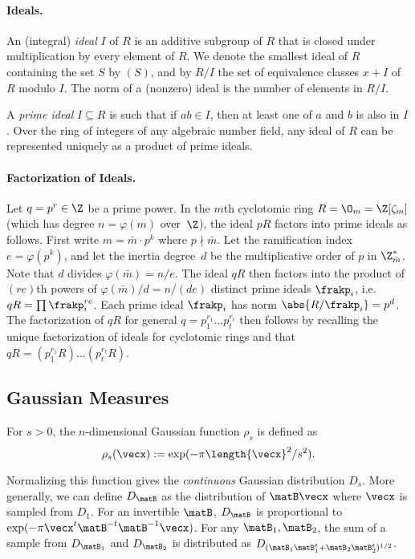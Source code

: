\paragraph{Ideals.}\label{par:ideals} An (integral) \emph{ideal} $I$ of $R$ is an
additive subgroup of $R$ that is closed under multiplication by every
element of $R$. We denote the smallest ideal of $R$ containing the set
$S$ by $(S)$, and by $R/I$ the set of equivalence classes $x+I$ of $R$
modulo $I$. The norm of a (nonzero) ideal is the number of elements in
$R/I$.

A \emph{prime ideal} $I \subseteq R$ is such that if $ab \in I$,
then at least one of $a$ and $b$ is also in $I$. Over the ring of
integers of any algebraic number field, any ideal of $R$ can be
represented uniquely as a product of prime ideals.

\paragraph{Factorization of Ideals.}\label{par:ideal-fact} Let $q=p^r \in \Z$ be a prime power.  In the $m$th cyclotomic ring
$R=\O_{m} = \Z[\zeta_{m}]$ (which has degree $n=\varphi(m)$
over~$\Z$), the ideal $pR$ factors into prime ideals as follows. First
write $m = \bar{m}\cdot p^{k}$ where $p \nmid \bar{m}$. Let the
ramification index 
$e = \varphi(p^{k})$, and let the inertia degree~$d$ be the multiplicative order of $p$
in $\Z_{\bar{m}}^{*}$. Note that $d$ divides $\varphi(\bar{m}) =
n/e$.
The ideal $qR$ then factors into the product of $(re)$th powers of
$\varphi(\bar{m})/d = n/(de)$ distinct prime ideals $\frakp_{i}$, i.e.
$qR=\prod \frakp_{i}^{re}$.  Each prime ideal $\frakp_{i}$ has norm
$\abs{R/\frakp_{i}}=p^{d}$. The factorization of $qR$ for general
$q=p_1^{r_1}\ldots p_t^{r_t}$ then follows by recalling the unique
factorization of ideals for cyclotomic rings and that $qR=(p_1^{r_1}R)\ldots(p_t^{r_t}R)$.

\subsection{Gaussian Measures}
\label{sec:gaussian-measures}

For $s > 0$, the $n$-dimensional Gaussian function $\rho_{s}$ is
defined as \[\rho_s(\vecx) := \text{exp}(-\pi\length{\vecx}^2/s^2).\]

Normalizing this function gives the \emph{continuous} Gaussian
distribution $D_{s}$. More generally, we can define $D_{\matB}$ as the
distribution of $\matB\vecx$ where $\vecx$ is sampled from $D_{1}$. For
an invertible $\matB$, $D_{\matB}$ is proportional to
$\text{exp}(-\pi\vecx^{t}\matB^{-t}\matB^{-1}\vecx)$. For any
$\matB_1, \matB_2$, the sum of a sample from $D_{\matB_1}$ and
$D_{\matB_2}$ is distributed as
$D_{(\matB_1\matB_1^{t}+\matB_2\matB_2^{t})^{1/2}}$.

